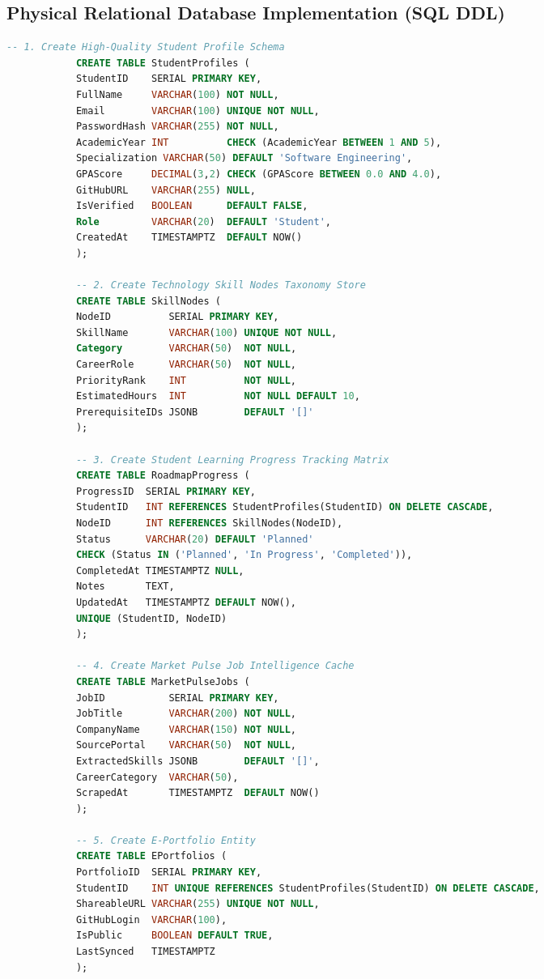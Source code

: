 \documentclass[12pt,a4paper]{report}
\begin{document}
\begin{spacing}{1.5}
		\section{Physical Relational Database Implementation (SQL DDL)}
		
		\begin{lstlisting}[language=SQL, caption={Core Database Schema DDL --- PCOLRP PostgreSQL Implementation}]
			-- 1. Create High-Quality Student Profile Schema
			CREATE TABLE StudentProfiles (
			StudentID    SERIAL PRIMARY KEY,
			FullName     VARCHAR(100) NOT NULL,
			Email        VARCHAR(100) UNIQUE NOT NULL,
			PasswordHash VARCHAR(255) NOT NULL,
			AcademicYear INT          CHECK (AcademicYear BETWEEN 1 AND 5),
			Specialization VARCHAR(50) DEFAULT 'Software Engineering',
			GPAScore     DECIMAL(3,2) CHECK (GPAScore BETWEEN 0.0 AND 4.0),
			GitHubURL    VARCHAR(255) NULL,
			IsVerified   BOOLEAN      DEFAULT FALSE,
			Role         VARCHAR(20)  DEFAULT 'Student',
			CreatedAt    TIMESTAMPTZ  DEFAULT NOW()
			);
			
			-- 2. Create Technology Skill Nodes Taxonomy Store
			CREATE TABLE SkillNodes (
			NodeID          SERIAL PRIMARY KEY,
			SkillName       VARCHAR(100) UNIQUE NOT NULL,
			Category        VARCHAR(50)  NOT NULL,
			CareerRole      VARCHAR(50)  NOT NULL,
			PriorityRank    INT          NOT NULL,
			EstimatedHours  INT          NOT NULL DEFAULT 10,
			PrerequisiteIDs JSONB        DEFAULT '[]'
			);
			
			-- 3. Create Student Learning Progress Tracking Matrix
			CREATE TABLE RoadmapProgress (
			ProgressID  SERIAL PRIMARY KEY,
			StudentID   INT REFERENCES StudentProfiles(StudentID) ON DELETE CASCADE,
			NodeID      INT REFERENCES SkillNodes(NodeID),
			Status      VARCHAR(20) DEFAULT 'Planned'
			CHECK (Status IN ('Planned', 'In Progress', 'Completed')),
			CompletedAt TIMESTAMPTZ NULL,
			Notes       TEXT,
			UpdatedAt   TIMESTAMPTZ DEFAULT NOW(),
			UNIQUE (StudentID, NodeID)
			);
			
			-- 4. Create Market Pulse Job Intelligence Cache
			CREATE TABLE MarketPulseJobs (
			JobID           SERIAL PRIMARY KEY,
			JobTitle        VARCHAR(200) NOT NULL,
			CompanyName     VARCHAR(150) NOT NULL,
			SourcePortal    VARCHAR(50)  NOT NULL,
			ExtractedSkills JSONB        DEFAULT '[]',
			CareerCategory  VARCHAR(50),
			ScrapedAt       TIMESTAMPTZ  DEFAULT NOW()
			);
			
			-- 5. Create E-Portfolio Entity
			CREATE TABLE EPortfolios (
			PortfolioID  SERIAL PRIMARY KEY,
			StudentID    INT UNIQUE REFERENCES StudentProfiles(StudentID) ON DELETE CASCADE,
			ShareableURL VARCHAR(255) UNIQUE NOT NULL,
			GitHubLogin  VARCHAR(100),
			IsPublic     BOOLEAN DEFAULT TRUE,
			LastSynced   TIMESTAMPTZ
			);
			

\end{lstlisting}
\end{spacing}
\end{document}
